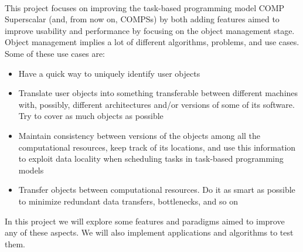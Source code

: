 \\
This project focuses on improving the task-based programming model COMP Superscalar (and, from now on, COMPSs) \cite{compss} by both adding features aimed to improve usability and performance by focusing on the object management stage. Object management implies a lot of different algorithms, problems, and use cases. Some of these use cases are:
\begin{itemize}
\item Have a quick way to uniquely identify user objects
\item Translate user objects into something transferable between different machines with, possibly, different architectures and/or versions of some of its software. Try to cover as much objects as possible
\item Maintain consistency between versions of the objects among all the computational resources, keep track of its locations, and use this information to exploit data locality when scheduling tasks in task-based programming models
\item Transfer objects between computational resources. Do it as smart as possible to minimize redundant data transfers, bottlenecks, and so on
\end{itemize}
In this project we will explore some features and paradigms aimed to improve any of these aspects. We will also implement applications and algorithms to test them.
